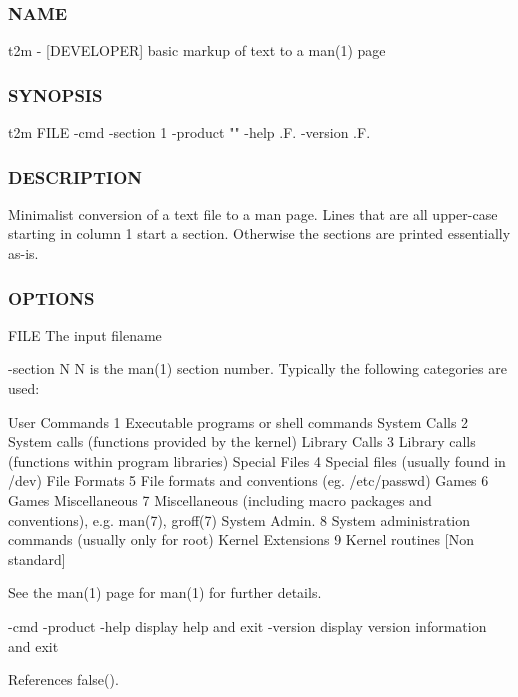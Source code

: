 \subsubsection*{N\+A\+ME}

t2m -\/ \mbox{[}D\+E\+V\+E\+L\+O\+P\+ER\mbox{]} basic markup of text to a man(1) page 

\subsubsection*{S\+Y\+N\+O\+P\+S\+IS}

\begin{DoxyVerb}t2m FILE -cmd -section 1 -product "" -help .F. -version .F.
\end{DoxyVerb}


\subsubsection*{D\+E\+S\+C\+R\+I\+P\+T\+I\+ON}

Minimalist conversion of a text file to a man page. Lines that are all upper-\/case starting in column 1 start a section. Otherwise the sections are printed essentially as-\/is.

\subsubsection*{O\+P\+T\+I\+O\+NS}

F\+I\+LE The input filename

-\/section N N is the man(1) section number. Typically the following categories are used\+:

User Commands 1 Executable programs or shell commands System Calls 2 System calls (functions provided by the kernel) Library Calls 3 Library calls (functions within program libraries) Special Files 4 Special files (usually found in /dev) File Formats 5 File formats and conventions (eg. /etc/passwd) Games 6 Games Miscellaneous 7 Miscellaneous (including macro packages and conventions), e.\+g. man(7), groff(7) System Admin. 8 System administration commands (usually only for root) Kernel Extensions 9 Kernel routines \mbox{[}Non standard\mbox{]}

See the man(1) page for man(1) for further details.

-\/cmd -\/product -\/help display help and exit -\/version display version information and exit 

References false().


